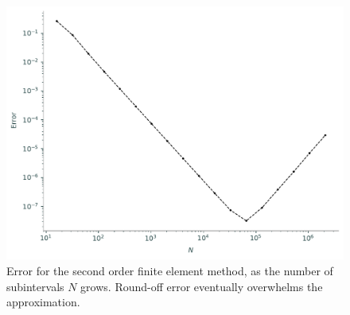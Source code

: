 \begin{figure}[ht]
\centering
\includegraphics[width=\textwidth]{figures/FEM_error_2nd_order.pdf}
\caption{Error for the second order finite element method, as the number of subintervals $N$ grows. Round-off error eventually overwhelms the approximation. }
\label{fig:FEM_error_2nd_order}
\end{figure}

